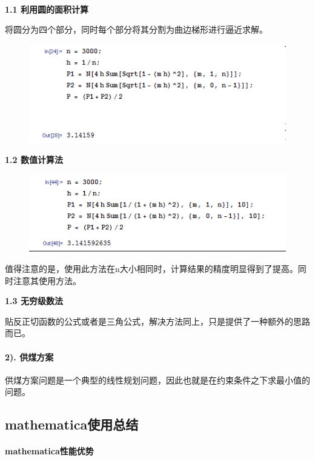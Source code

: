 \documentclass[UTF8]{ctexart}
\begin{document}
  ~

  \textbf{1.1 利用圆的面积计算}

  将圆分为四个部分，同时每个部分将其分割为曲边梯形进行逼近求解。
  
  \begin{figure}[!htb]
  \centering
  \includegraphics[]{4.1.png}
  \end{figure}

  \textbf{1.2 数值计算法}
  
  \begin{figure}[!htb]
  \centering
  \includegraphics[]{4.2.png}
  \end{figure}

  值得注意的是，使用此方法在n大小相同时，计算结果的精度明显得到了提高。同时注意其使用方法。

  \textbf{1.3 无穷级数法}

  贴反正切函数的公式或者是三角公式，解决方法同上，只是提供了一种额外的思路而已。

  \paragraph{2). 供煤方案}
  供煤方案问题是一个典型的线性规划问题，因此也就是在约束条件之下求最小值的问题。

  \subsection{mathematica使用总结}
  \paragraph{mathematica性能优势}
\end{document}
